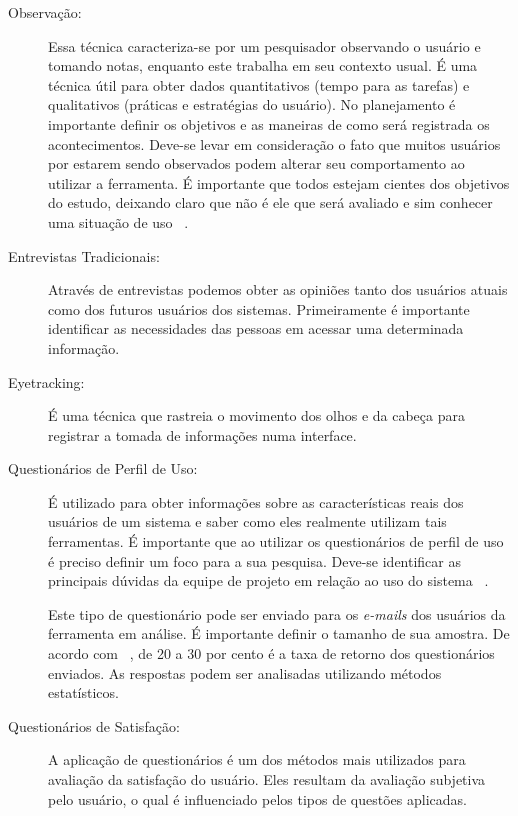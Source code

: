 \begin{description}

\item[Observação:]

	Essa técnica caracteriza-se por um pesquisador observando o usuário e tomando notas, enquanto este trabalha em seu contexto usual. É uma técnica útil para obter dados quantitativos (tempo para as tarefas) e qualitativos (práticas e estratégias do usuário). No planejamento é importante definir os objetivos e as maneiras de como será registrada os acontecimentos. Deve-se levar em consideração o fato que muitos usuários por estarem sendo observados podem alterar seu comportamento ao utilizar a ferramenta. É importante que todos estejam cientes dos objetivos do estudo, deixando claro que não é ele que será avaliado e sim conhecer uma situação de uso ~\cite{cybis2010}.

\item[Entrevistas Tradicionais:]

Através de entrevistas podemos obter as opiniões tanto dos usuários atuais como dos futuros usuários dos sistemas. Primeiramente é importante identificar as necessidades das pessoas em acessar uma determinada informação.

\item[Eyetracking:]

É uma técnica que rastreia o movimento dos olhos e da cabeça para registrar a tomada de informações numa interface.

\item[Questionários de Perfil de Uso:]
 
É utilizado para obter informações sobre as características reais dos usuários de um sistema e saber como eles realmente utilizam tais ferramentas. É importante que ao utilizar os questionários de perfil de uso é preciso definir um foco para a sua pesquisa. Deve-se identificar as principais dúvidas da equipe de projeto em relação ao uso do sistema ~\cite{cybis2010}.

Este tipo de questionário pode ser enviado para os \textit{e-mails} dos usuários da ferramenta em análise. É importante definir o tamanho de sua amostra. De acordo com ~, de 20 a 30 por cento é a taxa de retorno dos questionários enviados. As respostas podem ser analisadas utilizando métodos estatísticos.

\label{quest-satisf}
\item[Questionários de Satisfação:]

	A aplicação de questionários é um dos métodos mais utilizados para avaliação da satisfação do usuário. Eles resultam da avaliação subjetiva pelo usuário, o qual é influenciado pelos tipos de questões aplicadas.
	

\end{description}
